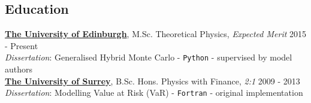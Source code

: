\documentclass[margin, line]{res}
\newcommand{\EdPS}{http://www.drps.ed.ac.uk/15-16/dpt/cxpgph11085.htm}
\newcommand{\EdSym}{http://www.drps.ed.ac.uk/15-16/dpt/cxpgph11097.htm}
\newcommand{\EdSMod}{http://www.drps.ed.ac.uk/15-16/dpt/cxmath11029.htm}
\newcommand{\EdQT}{http://www.drps.ed.ac.uk/15-16/dpt/cxphys11019.htm}
\newcommand{\EdPP}{http://www.drps.ed.ac.uk/15-16/dpt/cxphys11042.htm}
\newcommand{\EdMQFT}{http://www.drps.ed.ac.uk/15-16/dpt/cxpgph11094.htm}
\newcommand{\UoS}{http://www.surrey.ac.uk/physics/}
\newcommand{\UoE}{https://higgs.ph.ed.ac.uk}
\newenvironment{list1}{
	\begin{list}{\ding{113}}{%
		\setlength{\itemsep}{0in}
		\setlength{\parsep}{0in} \setlength{\parskip}{0in}
		\setlength{\topsep}{0in} \setlength{\partopsep}{0in}
		\setlength{\leftmargin}{0.17in}}}{\end{list}}
\begin{document}
\begin{resume}
\vspace{0.15in}
\section{\sc Education}
{\bf \href{\UoE}{The University of Edinburgh}}, M.Sc. Theoretical Physics, \emph{Expected Merit} \hfill {2015 - Present}
\\
    \vspace*{-.15in} %
    \vspace{-.3cm} %
    \emph{Dissertation}: Generalised Hybrid Monte Carlo - \verb|Python| -
             supervised by model authors\\

{\bf \href{\UoS}{The University of Surrey}}, B.Sc. Hons. Physics with Finance, \textit{2:1}
\hfill {2009 - 2013}
\\
	\vspace*{-.15in}
    \emph{Dissertation}: Modelling Value at Risk (VaR) %
                - \verb|Fortran| - original implementation



\end{resume}
\end{document}
